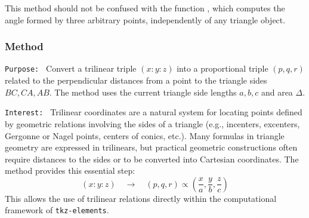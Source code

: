 \medskip

This method should not be confused with the function
, which computes the angle formed by three
arbitrary points, independently of any triangle object.

\vspace{1em}


\begin{tkzexample}[latex=7cm]
\begin{center}
\end{center}
\end{tkzexample}

\subsubsection{Method }
\label{ssub:triangle_trilinear_to_d}

\texttt{Purpose: }
Convert a trilinear triple \((x:y:z)\) into a proportional triple \((p,q,r)\) related to the perpendicular distances from a point to the triangle sides \(BC,CA,AB\).
The method uses the current triangle side lengths \(a,b,c\) and area \(\Delta\).

\medskip
\texttt{Interest: }
Trilinear coordinates are a natural system for locating points defined by geometric relations involving the sides of a triangle
(e.g., incenters, excenters, Gergonne or Nagel points, centers of conics, etc.).
Many formulas in triangle geometry are expressed in trilinears, but practical geometric constructions often require
distances to the sides or to be converted into Cartesian coordinates.
The method  provides this essential step:
\[
(x:y:z) \quad \longrightarrow \quad (p,q,r) \propto \left(\frac{x}{a}, \frac{y}{b}, \frac{z}{c}\right)
\]
This allows the use of trilinear relations directly within the computational framework of \texttt{tkz-elements}.

